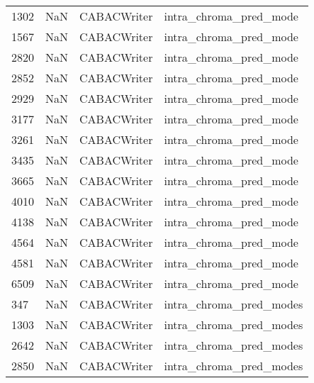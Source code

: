 \begin{tabular}{llll}
1302 &                   NaN &                CABACWriter &                    intra\_chroma\_pred\_mode \\
1567 &                   NaN &                CABACWriter &                    intra\_chroma\_pred\_mode \\
2820 &                   NaN &                CABACWriter &                    intra\_chroma\_pred\_mode \\
2852 &                   NaN &                CABACWriter &                    intra\_chroma\_pred\_mode \\
2929 &                   NaN &                CABACWriter &                    intra\_chroma\_pred\_mode \\
3177 &                   NaN &                CABACWriter &                    intra\_chroma\_pred\_mode \\
3261 &                   NaN &                CABACWriter &                    intra\_chroma\_pred\_mode \\
3435 &                   NaN &                CABACWriter &                    intra\_chroma\_pred\_mode \\
3665 &                   NaN &                CABACWriter &                    intra\_chroma\_pred\_mode \\
4010 &                   NaN &                CABACWriter &                    intra\_chroma\_pred\_mode \\
4138 &                   NaN &                CABACWriter &                    intra\_chroma\_pred\_mode \\
4564 &                   NaN &                CABACWriter &                    intra\_chroma\_pred\_mode \\
4581 &                   NaN &                CABACWriter &                    intra\_chroma\_pred\_mode \\
6509 &                   NaN &                CABACWriter &                    intra\_chroma\_pred\_mode \\
347  &                   NaN &                CABACWriter &                   intra\_chroma\_pred\_modes \\
1303 &                   NaN &                CABACWriter &                   intra\_chroma\_pred\_modes \\
2642 &                   NaN &                CABACWriter &                   intra\_chroma\_pred\_modes \\
2850 &                   NaN &                CABACWriter &                   intra\_chroma\_pred\_modes \\

\end{tabular}
